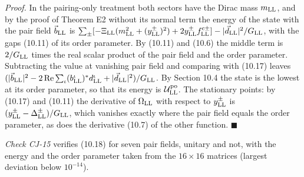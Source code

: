 \documentclass[
  10pt,
]{article}
\begin{document}
\emph{Proof.} In the pairing-only treatment both sectors have the Dirac
mass \(m_{\rm LL}\), and by the proof of Theorem E2 without its normal
term the energy of the state with the pair field \(\vec b_{\rm LL}\) is
\(\sum_\pm[-\Xi_{\rm LL}(m_{\rm LL}^2+(y^\pm_{\rm LL})^2)+2y^\pm_{\rm LL}f^{{\rm c}\pm}_{\rm LL}]-\lvert\vec d_{\rm LL}\rvert^2/G_{\rm LL}\),
with the gaps (10.11) of its order parameter. By (10.11) and (10.6) the
middle term is \(2/G_{\rm LL}\) times the real scalar product of the
pair field and the order parameter. Subtracting the value at vanishing
pair field and comparing with (10.17) leaves
\((\lvert\vec b_{\rm LL}\rvert^2-2\,\mathrm{Re}\sum_\iota(b^\iota_{\rm LL})^*d^\iota_{\rm LL}+\lvert\vec d_{\rm LL}\rvert^2)/G_{\rm LL}\).
By Section 10.4 the state is the lowest at its order parameter, so that
its energy is \(\mathcal U^{\rm po}_{\rm LL}\). The stationary points:
by (10.17) and (10.11) the derivative of \(\Omega_{\rm LL}\) with
respect to \(y^\pm_{\rm LL}\) is
\((y^\pm_{\rm LL}-\Delta^\pm_{\rm LL})/G_{\rm LL}\), which vanishes
exactly where the pair field equals the order parameter, as does the
derivative (10.7) of the other function. \(\blacksquare\)

\emph{Check CJ-15} verifies (10.18) for seven pair fields, unitary and
not, with the energy and the order parameter taken from the
\(16\times16\) matrices (largest deviation below \(10^{-14}\)).
\end{document}
